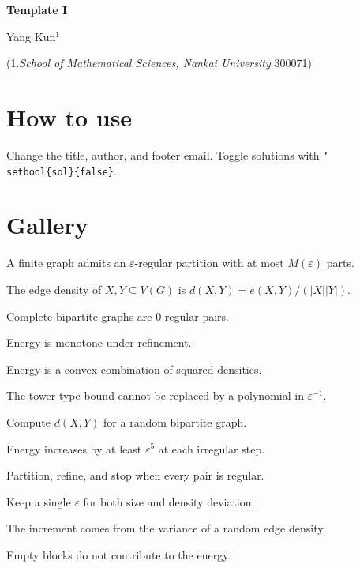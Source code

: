 \documentclass[a4paper,11pt]{article}
\newcommand{\yihao}{\fontsize{26pt}{39pt}\selectfont}
\newcommand{\xiaoer}{\fontsize{18pt}{27pt}\selectfont}
\begin{document}
\begin{center}
{\yihao \textbf{Template I}}
\end{center}
\begin{center}
{\xiaoer Yang Kun$^1$}\par
(1.\textit{School of Mathematical Sciences, Nankai University} 300071)
\end{center}

\section{How to use}
Change the title, author, and footer email. Toggle solutions with \texttt{\char`\\setbool\{sol\}\{false\}}.

\section{Gallery}
\begin{thmm}{}
A finite graph admits an $\varepsilon$-regular partition with at most $M(\varepsilon)$ parts.
\end{thmm}
\begin{deff}{}
The edge density of $X,Y\subseteq V(G)$ is $d(X,Y)=e(X,Y)/(|X||Y|)$.
\end{deff}
\begin{eg}{}
Complete bipartite graphs are $0$-regular pairs.
\end{eg}
\begin{lemm}{}
Energy is monotone under refinement.
\end{lemm}
\begin{proo}{}
Energy is a convex combination of squared densities.
\end{proo}
\begin{coll}{}
The tower-type bound cannot be replaced by a polynomial in $\varepsilon^{-1}$.
\end{coll}
\begin{ex}{}
Compute $d(X,Y)$ for a random bipartite graph.
\end{ex}
\begin{pf}
Energy increases by at least $\varepsilon^5$ at each irregular step.
\end{pf}
\begin{sol}
Partition, refine, and stop when every pair is regular.
\end{sol}
\begin{rem}
Keep a single $\varepsilon$ for both size and density deviation.
\end{rem}
\begin{ana}
The increment comes from the variance of a random edge density.
\end{ana}
\begin{cla}
Empty blocks do not contribute to the energy.
\end{cla}
\end{document}
